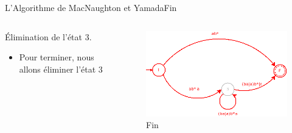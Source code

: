\documentclass{beamer}
\begin{document}
\begin{frame}{L'Algorithme de MacNaughton et Yamada}{Fin}
        \begin{columns}[T]
     \begin{column}{.48\textwidth}
         {\fontsize{8}{9}\selectfont Élimination de l'état 3.}
         \begin{itemize}
         
             \item {\fontsize{7}{8}\selectfont Pour terminer, nous allons éliminer l'état 3}
             
             
         \end{itemize}
     \end{column}
     
     \begin{column}{.48\textwidth}
     \begin{figure}
     \includegraphics[scale=0.37]{Diagramme5_1.png}
     \centering
     \caption{Fin}     
     \end{figure}
     \end{column}
        
     \end{columns}
\end{frame}
\end{document}
